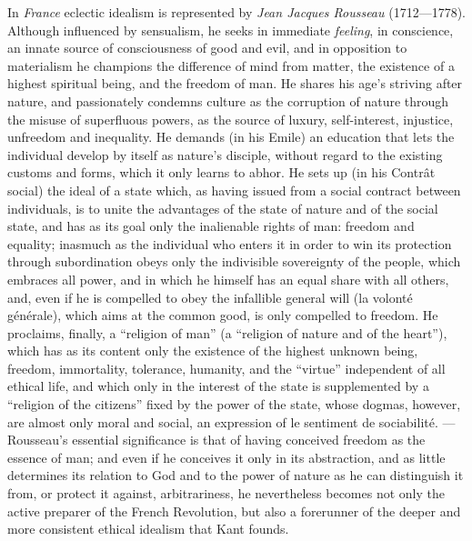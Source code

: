 In \emph{France} eclectic idealism is represented by \emph{Jean Jacques Rousseau} (1712---1778).
Although influenced by sensualism, he seeks in immediate \emph{feeling}, in conscience, an innate
source of consciousness of good and evil, and in opposition to materialism he champions the
difference of mind from matter, the existence of a highest spiritual being, and the freedom of man.
He shares his age's striving after nature, and passionately condemns culture as the corruption of
nature through the misuse of superfluous powers, as the source of luxury, self-interest, injustice,
unfreedom and inequality. He demands (in his Emile) an education that lets the individual develop
by itself as nature's disciple, without regard to the existing customs and forms, which it only
learns to abhor. He sets up (in his Contrât social) the ideal of a state which, as having issued
from a social contract between individuals, is to unite the advantages of the state of
nature and of the social state, and has as its goal only the inalienable rights of man: freedom and
equality; inasmuch as the individual who enters it in order to win its protection through
subordination obeys only the indivisible sovereignty of the people, which embraces all power, and in
which he himself has an equal share with all others, and, even if he is compelled to obey the
infallible general will (la volonté générale), which aims at the common good, is only compelled to
freedom. He proclaims, finally, a ``religion of man'' (a ``religion of nature and of the heart''),
which has as its content only the existence of the highest unknown being, freedom, immortality,
tolerance, humanity, and the ``virtue'' independent of all ethical life, and which only in the
interest of the state is supplemented by a ``religion of the citizens'' fixed by the power of the
state, whose dogmas, however, are almost only moral and social, an expression of le sentiment de
sociabilité. --- Rousseau's essential significance is that of having conceived freedom as the
essence of man; and even if he conceives it only in its abstraction, and as little determines its
relation to God and to the power of nature as he can distinguish it from, or protect it against,
arbitrariness, he nevertheless becomes not only the active preparer of the French Revolution, but
also a forerunner of the deeper and more consistent ethical idealism that Kant founds.

\divrule

